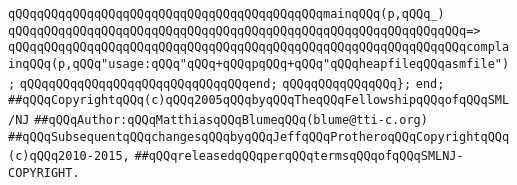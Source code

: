 \newline
\newline
\verb|qQQqqQQqqQQqqQQqqQQqqQQqqQQqqQQqqQQqqQQqqQQqmainqQQq(p,qQQq_)|\newline
\verb|qQQqqQQqqQQqqQQqqQQqqQQqqQQqqQQqqQQqqQQqqQQqqQQqqQQqqQQqqQQqqQQq=>|\newline
\verb|qQQqqQQqqQQqqQQqqQQqqQQqqQQqqQQqqQQqqQQqqQQqqQQqqQQqqQQqqQQqqQQqcomplainqQQq(p,qQQq"usage:qQQq"qQQq+qQQqpqQQq+qQQq"qQQqheapfileqQQqasmfile");|\newline
\verb|qQQqqQQqqQQqqQQqqQQqqQQqqQQqqQQqend;|\newline
\verb|qQQqqQQqqQQqqQQq};|\newline
\verb|end;|\newline
\newline
\verb|##qQQqCopyrightqQQq(c)qQQq2005qQQqbyqQQqTheqQQqFellowshipqQQqofqQQqSML/NJ|\newline
\verb|##qQQqAuthor:qQQqMatthiasqQQqBlumeqQQq(blume@tti-c.org)|\newline
\verb|##qQQqSubsequentqQQqchangesqQQqbyqQQqJeffqQQqProtheroqQQqCopyrightqQQq(c)qQQq2010-2015,|\newline
\verb|##qQQqreleasedqQQqperqQQqtermsqQQqofqQQqSMLNJ-COPYRIGHT.|\newline

